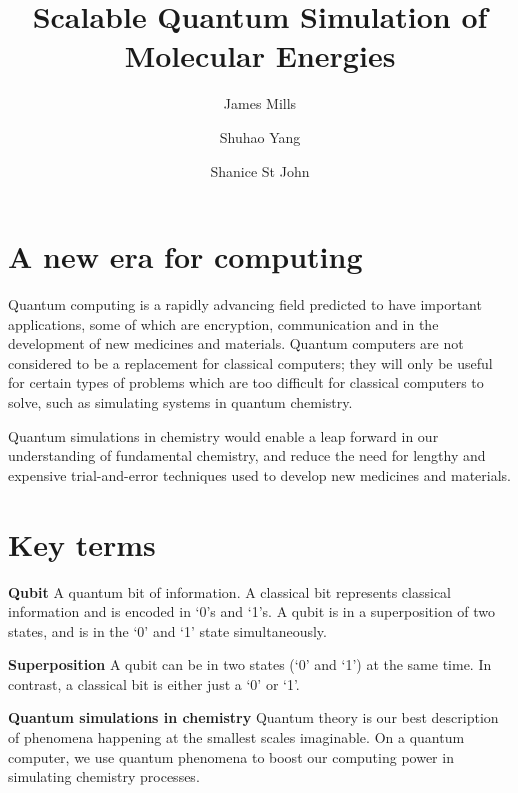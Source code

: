 \documentclass[14pt,landscape,color=UCLdarkred,margin=3cm]{uclposter}
\title{Scalable Quantum Simulation of Molecular Energies}
\author{James Mills}
\author{Shuhao Yang}
\author{Shanice St John}
\affil[1]{MSc Quantum Technologies, UCL}
\begin{document}

\maketitle

\begin{multicols}{3}

\section*{A new era for computing}


Quantum computing is a rapidly advancing field predicted to have important applications, some of which are encryption, communication and in the development of new medicines and materials. Quantum computers are not considered to be a replacement for classical computers; they will only be useful for certain types of problems which are too difficult for classical computers to solve, such as simulating systems in quantum chemistry.

Quantum simulations in chemistry would enable a leap forward in our understanding of fundamental chemistry, and reduce the need for lengthy and expensive trial-and-error techniques used to develop new medicines and materials.

\section*{Key terms}


\begin{highlightbox}
	\textbf{Qubit} A quantum bit of information. A classical bit represents classical information and is encoded in `0's and `1's. A qubit is in a superposition of two states, and is in the `0' and `1' state simultaneously.
\end{highlightbox}

\begin{highlightbox}
  \textbf{Superposition} A qubit can be in two states (`0' and `1') at the same time. In contrast, a classical bit is either just a `0' or `1'.
\end{highlightbox}



\begin{highlightbox}
\textbf{Quantum simulations in chemistry} Quantum theory is our best description of phenomena happening at the smallest scales imaginable. On a quantum computer, we use quantum phenomena to boost our computing power in simulating chemistry processes.


\end{highlightbox}
\end{multicols}
\end{document}
